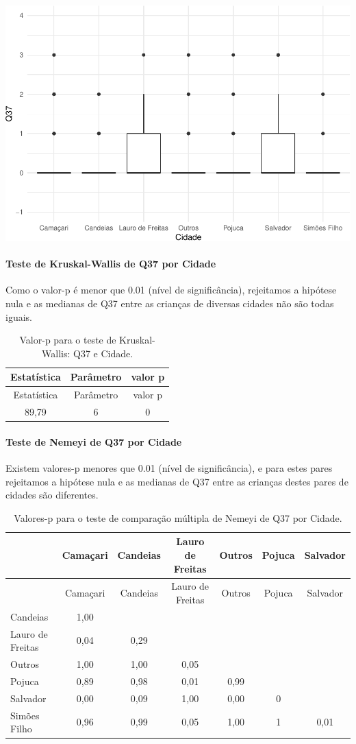 \documentclass[]{article}
\let\oldparagraph\paragraph
\renewcommand{\paragraph}[1]{\oldparagraph{#1}\mbox{}}
\begin{document}
\begin{center}\includegraphics[width=0.75\linewidth]{relatorio_covid19_files/figure-latex/unnamed-chunk-1375-1} \end{center}

\hypertarget{teste-de-kruskal-wallis-de-q37-por-cidade}{%
\paragraph{Teste de Kruskal-Wallis de Q37 por Cidade}\label{teste-de-kruskal-wallis-de-q37-por-cidade}}

Como o valor-p é menor que 0.01 (nível de significância), rejeitamos a hipótese nula e as medianas de Q37 entre as crianças de diversas cidades não são todas iguais.

\begin{longtable}[]{@{}ccc@{}}
\caption{\label{tab:unnamed-chunk-1377}Valor-p para o teste de Kruskal-Wallis: Q37 e Cidade.}\tabularnewline
\toprule
Estatística & Parâmetro & valor p\tabularnewline
\midrule
\endfirsthead
\toprule
Estatística & Parâmetro & valor p\tabularnewline
\midrule
\endhead
89,79 & 6 & 0\tabularnewline
\bottomrule
\end{longtable}

\hypertarget{teste-de-nemeyi-de-q37-por-cidade}{%
\paragraph{Teste de Nemeyi de Q37 por Cidade}\label{teste-de-nemeyi-de-q37-por-cidade}}

Existem valores-p menores que 0.01 (nível de significância), e para estes pares rejeitamos a hipótese nula e as medianas de Q37 entre as crianças destes pares de cidades são diferentes.

\begin{longtable}[]{@{}lcccccc@{}}
\caption{\label{tab:unnamed-chunk-1379}Valores-p para o teste de comparação múltipla de Nemeyi de Q37 por Cidade.}\tabularnewline
\toprule
& Camaçari & Candeias & Lauro de Freitas & Outros & Pojuca & Salvador\tabularnewline
\midrule
\endfirsthead
\toprule
& Camaçari & Candeias & Lauro de Freitas & Outros & Pojuca & Salvador\tabularnewline
\midrule
\endhead
Candeias & 1,00 & & & & &\tabularnewline
Lauro de Freitas & 0,04 & 0,29 & & & &\tabularnewline
Outros & 1,00 & 1,00 & 0,05 & & &\tabularnewline
Pojuca & 0,89 & 0,98 & 0,01 & 0,99 & &\tabularnewline
Salvador & 0,00 & 0,09 & 1,00 & 0,00 & 0 &\tabularnewline
Simões Filho & 0,96 & 0,99 & 0,05 & 1,00 & 1 & 0,01\tabularnewline
\bottomrule
\end{longtable}
\end{document}
